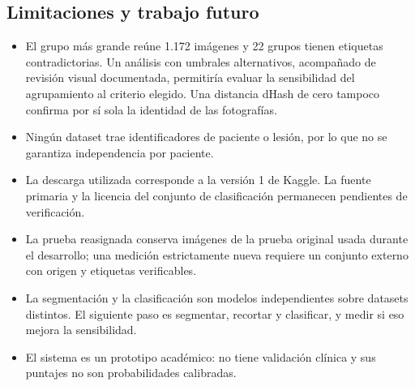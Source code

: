 \documentclass[conference]{IEEEtran}
\begin{document}
	\subsection*{Limitaciones y trabajo futuro}
	\begin{itemize}
		\item El grupo más grande reúne 1.172 imágenes y 22 grupos tienen etiquetas contradictorias. Un análisis con umbrales alternativos, acompañado de revisión visual documentada, permitiría evaluar la sensibilidad del agrupamiento al criterio elegido. Una distancia dHash de cero tampoco confirma por sí sola la identidad de las fotografías.
		\item Ningún dataset trae identificadores de paciente o lesión, por lo que no se garantiza independencia por paciente.
		\item La descarga utilizada corresponde a la versión 1 de Kaggle. La fuente primaria y la licencia del conjunto de clasificación permanecen pendientes de verificación.
		\item La prueba reasignada conserva imágenes de la prueba original usada durante el desarrollo; una medición estrictamente nueva requiere un conjunto externo con origen y etiquetas verificables.
		\item La segmentación y la clasificación son modelos independientes sobre datasets distintos. El siguiente paso es segmentar, recortar y clasificar, y medir si eso mejora la sensibilidad.
		\item El sistema es un prototipo académico: no tiene validación clínica y sus puntajes no son probabilidades calibradas.
	\end{itemize}
	
\end{document}
